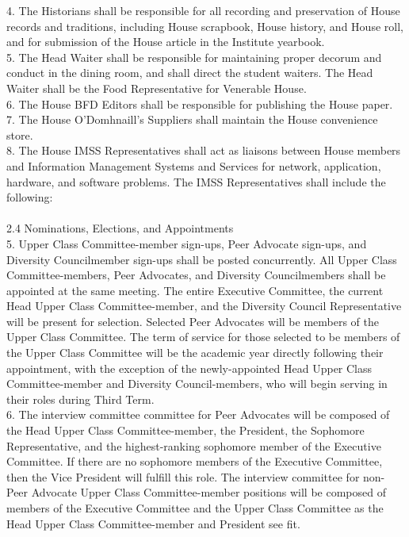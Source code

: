 \documentclass[10pt]{article} %
\begin{document}
\begin{itemize}
        4. The Historians shall be responsible for all recording and preservation of House records and traditions, including House scrapbook, House history, and House roll, and for submission of the House article in the Institute yearbook. \\
        5. The Head Waiter shall be responsible for maintaining proper decorum and conduct in the dining room, and shall direct the student waiters. The Head Waiter shall be the Food Representative for Venerable House. \\
        6. The House BFD Editors shall be responsible for publishing the House paper. \\
        7. The House O'Domhnaill's Suppliers shall maintain the House convenience store. \\
        8. The House IMSS Representatives shall act as liaisons between House members and Information Management Systems and Services for network, application, hardware, and software problems. The IMSS Representatives shall include the following: \\ \\
        2.4 Nominations, Elections, and Appointments \\
        5. Upper Class Committee-member sign-ups, Peer Advocate sign-ups, and Diversity Councilmember sign-ups shall be posted concurrently. All Upper Class Committee-members, Peer Advocates, and Diversity Councilmembers shall be appointed at the same meeting. The entire Executive Committee, the current Head Upper Class Committee-member, and the Diversity Council Representative will be present for selection. Selected Peer Advocates will be members of the Upper Class Committee. The term of service for those selected to be members of the Upper Class Committee will be the academic year directly following their appointment, with the exception of the newly-appointed Head Upper Class Committee-member and Diversity Council-members, who will begin serving in their roles during Third Term. \\
        6. The interview committee committee for Peer Advocates will be composed of the Head Upper Class Committee-member, the President, the Sophomore Representative, and the highest-ranking sophomore member of the Executive Committee. If there are no sophomore members of the Executive Committee, then the Vice President will fulfill this role. The interview committee for non-Peer Advocate Upper Class Committee-member positions will be composed of members of the Executive Committee and the Upper Class Committee as the Head Upper Class Committee-member and President see fit. \\

\end{itemize}
\end{document}
